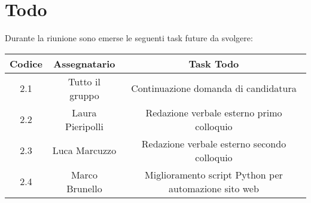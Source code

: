 \section{Todo}

Durante la riunione sono emerse le seguenti task future da svolgere:

\vspace{0.5cm}

\begin{table}[htbp]
	\begin{tabular}{|c|c|c|}
		\hline
		\rowcolor[gray]{0.9}
		Codice & Assegnatario & Task Todo \\
		\hline
		2.1 & Tutto il gruppo & Continuazione domanda di candidatura \\
		\hline
		2.2 & Laura Pieripolli & Redazione verbale esterno primo colloquio \\
		\hline
		2.3 & Luca Marcuzzo & Redazione verbale esterno secondo colloquio \\
		\hline
		2.4 & Marco Brunello & Miglioramento script Python per automazione sito web \\
		\hline
	\end{tabular}
\end{table}